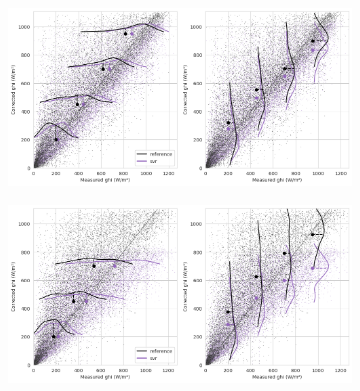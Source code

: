 \begin{figure}[]
    \centering
    \begin{subfigure}{\columnwidth}
        \includegraphics[width=\columnwidth]{figures/first_study/scatter_plot_svr_site1_mae.png}
    \end{subfigure}
\medskip
    \begin{subfigure}{\columnwidth}
        \includegraphics[width=\columnwidth]{figures/first_study/scatter_plot_svr_site2_mae.png}
    \end{subfigure}
\end{figure}
